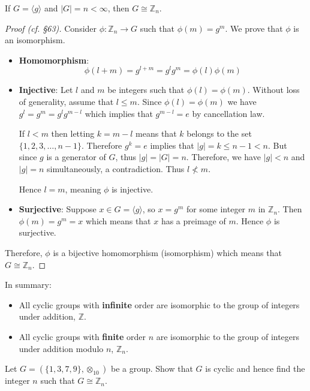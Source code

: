 \begin{theorem}\label{thrm-finite-cyclic-group-isomorphic-to-Zn}
    If $G = \langle g\rangle$ and $|G| = n < \infty$, then $G \cong \mathbb{Z}_n$.
\end{theorem}
\begin{proof}[Proof (cf. \cite{clark_1984} \S 63)]
    Consider $\phi: \mathbb{Z}_n \to G$ such that $\phi(m) = g^m$. We prove that $\phi$ is an isomorphism.
    \begin{itemize}
        \item \textbf{Homomorphism}:
        \[
            \phi(l+m) = g^{l+m} = g^lg^m = \phi(l)\phi(m)
        \]
        \item \textbf{Injective}: Let $l$ and $m$ be integers such that $\phi(l) = \phi(m)$. Without loss of generality, assume that $l \leq m$. Since $\phi(l) = \phi(m)$ we have $g^l = g^m = g^lg^{m-l}$ which implies that $g^{m-l} = e$ by cancellation law.

        If $l < m$ then letting $k = m - l$ means that $k$ belongs to the set $\{1, 2, 3, \dots, n-1\}$. Therefore $g^k = e$ implies that $|g| = k \leq n - 1 < n$. But since $g$ is a generator of $G$, thus $|g| = |G| = n$. Therefore, we have $|g| < n$ and $|g| = n$ simultaneously, a contradiction. Thus $l \not< m$.

        Hence $l = m$, meaning $\phi$ is injective.
        \item \textbf{Surjective}: Suppose $x \in G = \langle g\rangle$, so $x = g^m$ for some integer $m$ in $\mathbb{Z}_n$. Then $\phi(m) = g^m = x$ which means that $x$ has a preimage of $m$. Hence $\phi$ is surjective.
    \end{itemize}

    Therefore, $\phi$ is a bijective homomorphism (isomorphism) which means that $G \cong \mathbb{Z}_n$.
\end{proof}

In summary:
\begin{itemize}
    \item All cyclic groups with \textbf{infinite} order are isomorphic to the group of integers under addition, $\mathbb{Z}$.
    \item All cyclic groups with \textbf{finite} order $n$ are isomorphic to the group of integers under addition modulo $n$, $\mathbb{Z}_n$.
\end{itemize}

\begin{exercise}
    Let $G = (\{1, 3, 7, 9\}, \otimes_{10})$ be a group. Show that $G$ is cyclic and hence find the integer $n$ such that $G \cong \mathbb{Z}_n$.
\end{exercise}

